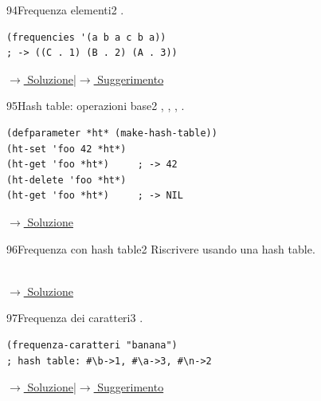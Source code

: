 \label{ex:94}
\begin{stdbox}{94}{Frequenza elementi}{2}
 .
\nopagebreak
\begin{lstlisting}
(frequencies '(a b a c b a))
; -> ((C . 1) (B . 2) (A . 3))
\end{lstlisting}


\small\color{black!55}\hyperref[sol:94]{$\rightarrow$ Soluzione}\enspace\textcolor{black!30}{|}\enspace\hyperref[hint:94]{$\rightarrow$ Suggerimento}\normalsize\color{black}
\end{stdbox}

\label{ex:95}
\begin{essbox}{95}{Hash table: operazioni base}{2}
 , ,
, .
\begin{lstlisting}
(defparameter *ht* (make-hash-table))
(ht-set 'foo 42 *ht*)
(ht-get 'foo *ht*)     ; -> 42
(ht-delete 'foo *ht*)
(ht-get 'foo *ht*)     ; -> NIL
\end{lstlisting}


\small\color{black!55}\hyperref[sol:95]{$\rightarrow$ Soluzione}\normalsize\color{black}
\end{essbox}

\label{ex:96}
\begin{colbox}{96}{Frequenza con hash table}{2}
Riscrivere  usando una hash table.\\\\

\small\color{black!55}\hyperref[sol:96]{$\rightarrow$ Soluzione}\normalsize\color{black}
\end{colbox}

\label{ex:97}
\begin{stdbox}{97}{Frequenza dei caratteri}{3}
 .
\nopagebreak
\begin{lstlisting}
(frequenza-caratteri "banana")
; hash table: #\b->1, #\a->3, #\n->2
\end{lstlisting}


\small\color{black!55}\hyperref[sol:97]{$\rightarrow$ Soluzione}\enspace\textcolor{black!30}{|}\enspace\hyperref[hint:97]{$\rightarrow$ Suggerimento}\normalsize\color{black}
\end{stdbox}

